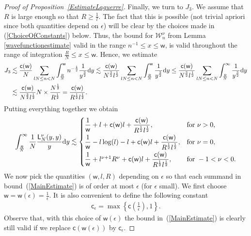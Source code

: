 \documentclass[pdftex]{sigma}
\numberwithin{equation}{section}
\begin{document}
\begin{proof}[Proof of Proposition~\ref{EstimateLaguerre}]
Finally, we turn to $J_3$. We assume that $R$ is large enough so that $R \ge \frac{1}{l}$. The fact that this is possible (not trivial apriori since both quantities depend on $\epsilon$) will be clear by the choices made in (\ref{ChoiceOfConstants}) below. Thus, the bound for $\mathcal{W}_n^{\nu}$ from Lemma \ref{wavefunctionestimate} valid in the range $n^{-1}\le x \le \mathsf{w}$, is valid throughout the range of integration $\frac{R}{N} \le x \le \mathsf{w}$. Hence, we estimate
\begin{align*}
J_3 &\lesssim \frac{\mathsf{c}(\mathsf{w})}{N} \sum_{lN \le n < N}^{}\int_{\frac{R}{N}}^{\mathsf{w}}n^{-\frac{1}{2}}\frac{1}{y^{\frac{3}{2}}}{\rm d}y\lesssim \frac{\mathsf{c}(\mathsf{w})}{N^{\frac{3}{2}}l^{\frac{1}{2}}} \sum_{lN \le n < N}^{}\int_{\frac{R}{N}}^{\mathsf{w}}\frac{1}{y^{\frac{3}{2}}}{\rm d}y\le \frac{\mathsf{c}(\mathsf{w})}{N^{\frac{3}{2}}l^{\frac{1}{2}}} \sum_{lN \le n < N}^{}\int_{\frac{R}{N}}^{\infty}\frac{1}{y^{\frac{3}{2}}}{\rm d}y \nonumber\\
&\lesssim \frac{\mathsf{c}(\mathsf{w})}{N^{\frac{3}{2}}l^{\frac{1}{2}}} N \times \frac{N^{\frac{1}{2}}}{R^{\frac{1}{2}}}=\frac{\mathsf{c}(\mathsf{w})}{R^{\frac{1}{2}}l^{\frac{1}{2}}}.
\end{align*}
Putting everything together we obtain
\begin{gather}\label{MainEstimate}
\int_{\frac{R}{N}}^{\infty}\frac{1}{N}\frac{\mathsf{L}_N^{\nu}(y,y)}{y}{\rm d}y \lesssim \begin{cases}
\dfrac{1}{\mathsf{w}}+l+\mathsf{c}(\mathsf{w})l+\dfrac{\mathsf{c}(\mathsf{w})}{R^{\frac{1}{2}}l^{\frac{1}{2}}}, &\text{for } \nu>0,\vspace{1mm}\\
\dfrac{1}{\mathsf{w}}-l\log(l)-l+\mathsf{c}(\mathsf{w})l+\dfrac{\mathsf{c}(\mathsf{w})}{R^{\frac{1}{2}}l^{\frac{1}{2}}}, &\text{for } \nu=0,\vspace{1mm}\\
\dfrac{1}{\mathsf{w}}+l^{\nu+1}R^{\nu}+\mathsf{c}(\mathsf{w})l+\dfrac{\mathsf{c}(\mathsf{w})}{R^{\frac{1}{2}}l^{\frac{1}{2}}}, &\text{for } -1<\nu<0.
\end{cases}
\end{gather}
We now pick the quantities $(\mathsf{w},l,R)$ depending on $\epsilon$ so that each summand in bound~(\ref{MainEstimate}) is of order at most $\epsilon$ (for $\epsilon$ small). We first choose $\mathsf{w}=\mathsf{w}(\epsilon)=\frac{1}{\epsilon}$. It is also convenient to define the following constant
 \begin{gather*}
\mathsf{c}_{\epsilon}=\max \left\{\mathsf{c}\left(\frac{1}{\epsilon}\right),1 \right\}.
 \end{gather*}
Observe that, with this choice of $\mathsf{w}(\epsilon)$ the bound in~(\ref{MainEstimate}) is clearly still valid if we replace $\mathsf{c}(\mathsf{w}(\epsilon))$ by $\mathsf{c}_{\epsilon}$.


\end{proof}
\end{document}
